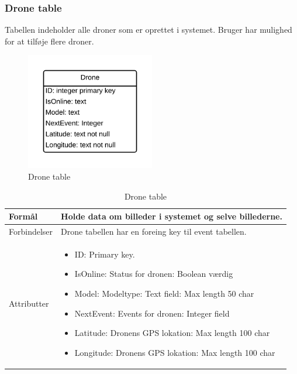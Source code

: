 \subsubsection*{Drone table}
Tabellen indeholder alle droner som er oprettet i systemet. Bruger har mulighed for at tilføje flere droner.
\vspace{-5pt}
\begin{figure}[H]
	\centering
	\includegraphics[width=0.5\textwidth]{Billeder/database/DroneTable.png}
	\vspace{-5pt}
	\caption{Drone table}
	\label{fig:drone_table}
\end{figure}

\begin{table}[H]
\begin{tabular}{| p{3cm}| p{11.5cm}|}
\hline

Formål	 							& Holde data om billeder i systemet og selve billederne.\\\hline
Forbindelser						& Drone tabellen har en foreing key til event tabellen.\\\hline
Attributter						& \begin{itemize}
												\item ID: Primary key.
												\item IsOnline: Status for dronen: Boolean værdig
												\item Model: Modeltype: Text field: Max length 50 char
												\item NextEvent: Events for dronen: Integer field
												\item Latitude: Dronens GPS lokation: Max length 100 char  
												\item Longitude: Dronens GPS lokation: Max length 100 char
											\end{itemize} \\\hline 
\end{tabular}
\caption{Drone table}
\label{tab:drone_table}
\end{table}